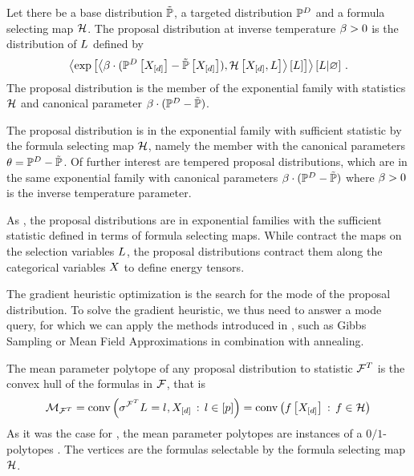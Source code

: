 \begin{definition}
    Let there be a base distribution $\tilde{\mathbb{P}}$, a targeted distribution $\mathbb{P}^{D}$ and a formula selecting map $\mathcal{H}$.
    The proposal distribution at inverse temperature $\beta>0$ is the distribution of $L$ defined by
    \begin{align*}
        \left\langle \mathrm{exp}\left[\left\langle \beta\cdot(\mathbb{P}^{D}\left[X_{[d]}\right]-\tilde{\mathbb{P}}\left[X_{[d]}\right]),\mathcal{H}\left[X_{[d]},L\right]\right\rangle \left[ L \right]\right] \right\rangle \left[ L | \varnothing \right] \, .
    \end{align*}
    The proposal distribution is the member of the exponential family with statistics $\mathcal{H}$ and canonical parameter $\beta\cdot(\mathbb{P}^{D}-\tilde{\mathbb{P}})$.
\end{definition}


The proposal distribution is in the exponential family with sufficient statistic by the formula selecting map $\mathcal{H}$, namely the member with the canonical parameters $\theta=\mathbb{P}^{D}-\tilde{\mathbb{P}}$.
Of further interest are tempered proposal distributions, which are in the same exponential family with canonical parameters $\beta\cdot(\mathbb{P}^{D}-\tilde{\mathbb{P}})$ where $\beta>0$ is the inverse temperature parameter.

As \MarkovLogicNetworks{}, the proposal distributions are in exponential families with the sufficient statistic defined in terms of formula selecting maps.
While \MarkovLogicNetworks{} contract the maps on the selection variables $L$, the proposal distributions contract them along the categorical variables $X$ to define energy tensors.

The gradient heuristic optimization  is the search for the mode of the proposal distribution.
To solve the gradient heuristic, we thus need to answer a mode query, for which we can apply the methods introduced in , such as Gibbs Sampling or Mean Field Approximations in combination with annealing.


The mean parameter polytope of any proposal distribution to statistic $\mathcal{F}^T$ is the convex hull of the formulas in $\mathcal{F}$, that is
\begin{align*}
    \mathcal{M}_{\mathcal{F}^T}
    = \mathrm{conv}\left(\sigma^{\mathcal{F}^T}{L_{}=l_{},X_{[d]}} \,:\, l\in[p]\right)
    = \mathrm{conv}\left(f\left[X_{[d]}\right] \,:\, f\in\mathcal{H}\right)
\end{align*}
As it was the case for \MarkovLogicNetworks{}, the mean parameter polytopes are instances of a $0/1$-polytopes \cite{ziegler_lectures_2000,gillmann_01-polytopes_2007}.
The vertices are the formulas selectable by the formula selecting map $\mathcal{H}$.

